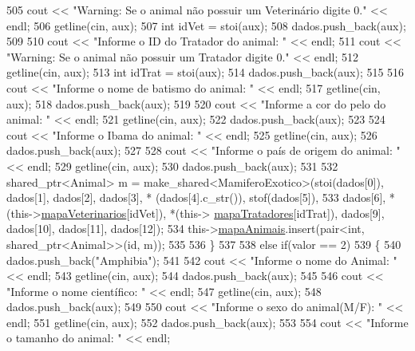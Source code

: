 \begin{DoxyCode}
505         cout << \textcolor{stringliteral}{"Warning: Se o animal não possuir um Veterinário digite 0."} << endl;
506         getline(cin, aux);
507         \textcolor{keywordtype}{int} idVet = stoi(aux);
508         dados.push\_back(aux);
509 
510         cout << \textcolor{stringliteral}{"Informe o ID do Tratador do animal: "} << endl;
511         cout << \textcolor{stringliteral}{"Warning: Se o animal não possuir um Tratador digite 0."} << endl;
512         getline(cin, aux);
513         \textcolor{keywordtype}{int} idTrat = stoi(aux);
514         dados.push\_back(aux);
515 
516         cout << \textcolor{stringliteral}{"Informe o nome de batismo do animal: "} << endl;
517         getline(cin, aux);
518         dados.push\_back(aux);
519 
520         cout << \textcolor{stringliteral}{"Informe a cor do pelo do animal: "} << endl;
521         getline(cin, aux);
522         dados.push\_back(aux);
523 
524         cout << \textcolor{stringliteral}{"Informe o Ibama do animal: "} << endl;
525         getline(cin, aux);
526         dados.push\_back(aux);
527 
528         cout << \textcolor{stringliteral}{"Informe o país de origem do animal: "} << endl;
529         getline(cin, aux);
530         dados.push\_back(aux);
531 
532         shared\_ptr<Animal> m = make\_shared<MamiferoExotico>(stoi(dados[0]), dados[1], dados[2], dados[3], *
      (dados[4].c\_str()), stof(dados[5]),
533                     dados[6], *(this->\hyperlink{classPetFera_a2bed2112a627bbdb3c0338654330a1ab}{mapaVeterinarios}[idVet]), *(this->
      \hyperlink{classPetFera_ac85920fc6c1471743838e6fe4444304d}{mapaTratadores}[idTrat]), dados[9], dados[10], dados[11], dados[12]);
534         this->\hyperlink{classPetFera_ab0ba5fe6332bcffdabb7b03001280697}{mapaAnimais}.insert(pair<\textcolor{keywordtype}{int}, shared\_ptr<Animal>>(\textcolor{keywordtype}{id}, m));
535 
536     \}
537 
538     \textcolor{keywordflow}{else} \textcolor{keywordflow}{if}(valor == 2)
539     \{
540         dados.push\_back(\textcolor{stringliteral}{"Amphibia"});
541 
542         cout << \textcolor{stringliteral}{"Informe o nome do Animal: "} << endl;
543         getline(cin, aux);
544         dados.push\_back(aux);
545 
546         cout << \textcolor{stringliteral}{"Informe o nome científico:  "} << endl;
547         getline(cin, aux);
548         dados.push\_back(aux);
549 
550         cout << \textcolor{stringliteral}{"Informe o sexo do animal(M/F): "} << endl;
551         getline(cin, aux);
552         dados.push\_back(aux);
553 
554         cout << \textcolor{stringliteral}{"Informe o tamanho do animal: "} << endl;

\end{DoxyCode}
